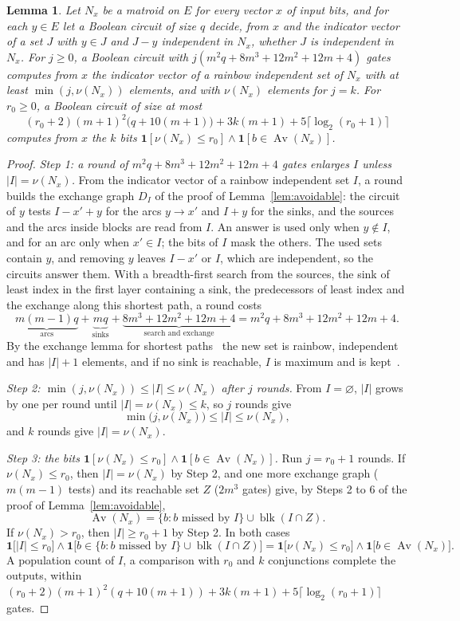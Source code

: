 \documentclass[11pt]{article}
\newtheorem{lemma}[theorem]{Lemma}
\newcommand{\blk}{\operatorname{blk}}
\newcommand{\Av}{\operatorname{Av}}
\begin{document}
\begin{lemma}
\label{lem:augment}
Let $N_x$ be a matroid on $E$ for every vector $x$ of input bits, and for each
$y\in E$ let a Boolean circuit of size $q$ decide, from $x$ and the indicator
vector of a set $J$ with $y\in J$ and $J-y$ independent in $N_x$, whether $J$ is
independent in $N_x$.  For $j\ge0$, a Boolean circuit with
$j(m^{2}q+8m^{3}+12m^{2}+12m+4)$ gates computes from $x$ the indicator vector of
a rainbow independent set of $N_x$ with at least $\min(j,\nu(N_x))$ elements, and
with $\nu(N_x)$ elements for $j=k$.  For $r_0\ge0$, a Boolean circuit of size at
most
\[
  (r_0+2)(m+1)^{2}\bigl(q+10(m+1)\bigr)+3k(m+1)+5\lceil\log_2(r_0+1)\rceil
\]
computes from $x$ the $k$ bits
$\mathbf 1[\nu(N_x)\le r_0]\wedge\mathbf 1[b\in\Av(N_x)]$.
\end{lemma}

\begin{proof}
\emph{Step 1: a round of $m^{2}q+8m^{3}+12m^{2}+12m+4$ gates enlarges $I$ unless $|I|=\nu(N_x)$.}  From the indicator vector of a rainbow independent set
$I$, a round builds the exchange graph $D_I$ of the proof of
Lemma~\ref{lem:avoidable}: the circuit of $y$ tests $I-x'+y$ for the arcs
$y\to x'$ and $I+y$ for the sinks, and the sources and the arcs inside blocks are
read from $I$.  An answer is used only when $y\notin I$, and for an arc only when
$x'\in I$; the bits of $I$ mask the others.  The used sets contain $y$, and
removing $y$ leaves $I-x'$ or $I$, which are independent, so the circuits answer
them.  With a breadth-first search from the sources, the sink of least index in
the first layer containing a sink, the predecessors of least index and the
exchange along this shortest path, a round costs
\[
  \underbrace{m(m-1)q}_{\text{arcs}}+\underbrace{mq}_{\text{sinks}}
  +\underbrace{8m^{3}+12m^{2}+12m+4}_{\text{search and exchange}}
  =m^{2}q+8m^{3}+12m^{2}+12m+4.
\]
By the exchange lemma for shortest paths~\cite{schrijver03} the new set is
rainbow, independent and has $|I|+1$ elements, and if no sink is reachable, $I$
is maximum and is kept~\cite{lawler75,schrijver03}.

\emph{Step 2: $\min(j,\nu(N_x))\le|I|\le\nu(N_x)$ after $j$ rounds.}  From $I=\varnothing$, $|I|$ grows by one per round
until $|I|=\nu(N_x)\le k$, so $j$ rounds give
\[
  \min\bigl(j,\nu(N_x)\bigr)\le|I|\le\nu(N_x),
\]
and $k$ rounds give $|I|=\nu(N_x)$.

\emph{Step 3: the bits $\mathbf 1[\nu(N_x)\le r_0]\wedge\mathbf 1[b\in\Av(N_x)]$.}  Run $j=r_0+1$ rounds.  If $\nu(N_x)\le r_0$, then
$|I|=\nu(N_x)$ by Step 2, and one more exchange graph ($m(m-1)$ tests) and its
reachable set $Z$ ($2m^{3}$ gates) give, by Steps 2 to 6 of the proof of
Lemma~\ref{lem:avoidable},
\[
  \Av(N_x)=\{b:b\text{ missed by }I\}\cup\blk(I\cap Z).
\]
If $\nu(N_x)>r_0$, then $|I|\ge r_0+1$ by Step 2.  In both cases
\[
  \mathbf 1\bigl[|I|\le r_0\bigr]\wedge\mathbf 1\bigl[b\in\{b:b\text{ missed by }I\}\cup\blk(I\cap Z)\bigr]
  =\mathbf 1\bigl[\nu(N_x)\le r_0\bigr]\wedge\mathbf 1\bigl[b\in\Av(N_x)\bigr].
\]
A population count of $I$, a comparison with $r_0$ and $k$ conjunctions complete
the outputs, within
$(r_0+2)(m+1)^{2}(q+10(m+1))+3k(m+1)+5\lceil\log_2(r_0+1)\rceil$ gates.
\end{proof}
\end{document}
